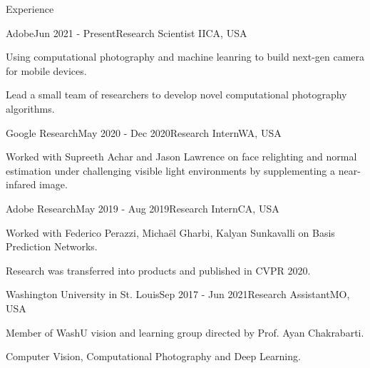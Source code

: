 \documentclass{resume} %
\begin{document}
\begin{rSection}{Experience}


\begin{rSubsection}{Adobe}{Jun 2021 - Present}{Research Scientist II}{CA, USA}
\item Using computational photography and machine leanring to build next-gen camera for mobile devices.
\item Lead a small team of researchers to develop novel computational photography algorithms.

\end{rSubsection}



\begin{rSubsection}{Google Research}{May 2020 - Dec 2020}{Research Intern}{WA, USA}
\item Worked with Supreeth Achar and Jason Lawrence on face relighting and normal estimation under challenging visible light environments by supplementing a near-infared image.

\end{rSubsection}


\begin{rSubsection}{Adobe Research}{May 2019 - Aug 2019}{Research Intern}{CA, USA}
\item Worked with Federico Perazzi, Micha\"el Gharbi, Kalyan Sunkavalli on Basis Prediction Networks.
\item Research was transferred into products and published in CVPR 2020.

\end{rSubsection}

\begin{rSubsection}{Washington University in St. Louis}{Sep 2017 - Jun 2021}{Research Assistant}{MO, USA}
\item Member of WashU vision and learning group directed by Prof. Ayan Chakrabarti.
\item Computer Vision, Computational Photography and Deep Learning.
\end{rSubsection}


\end{rSection}
\end{document}
